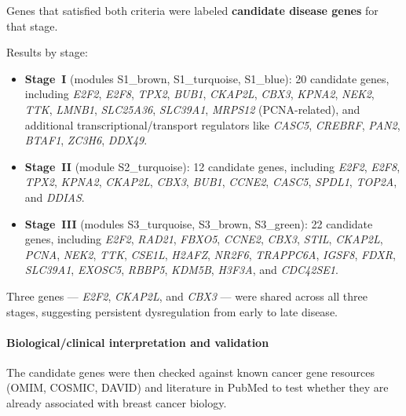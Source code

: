 \documentclass[10pt]{extarticle}
\begin{document}
Genes that satisfied both criteria were labeled \textbf{candidate disease genes} for that stage.

Results by stage:
\begin{itemize}[label=-]
    \item \textbf{Stage~I} (modules S1\_brown, S1\_turquoise, S1\_blue): 20 candidate genes, including \textit{E2F2}, \textit{E2F8}, \textit{TPX2}, \textit{BUB1}, \textit{CKAP2L}, \textit{CBX3}, \textit{KPNA2}, \textit{NEK2}, \textit{TTK}, \textit{LMNB1}, \textit{SLC25A36}, \textit{SLC39A1}, \textit{MRPS12} (PCNA-related), and additional transcriptional/transport regulators like \textit{CASC5}, \textit{CREBRF}, \textit{PAN2}, \textit{BTAF1}, \textit{ZC3H6}, \textit{DDX49}.
    \item \textbf{Stage~II} (module S2\_turquoise): 12 candidate genes, including \textit{E2F2}, \textit{E2F8}, \textit{TPX2}, \textit{KPNA2}, \textit{CKAP2L}, \textit{CBX3}, \textit{BUB1}, \textit{CCNE2}, \textit{CASC5}, \textit{SPDL1}, \textit{TOP2A}, and \textit{DDIAS}.
    \item \textbf{Stage~III} (modules S3\_turquoise, S3\_brown, S3\_green): 22 candidate genes, including \textit{E2F2}, \textit{RAD21}, \textit{FBXO5}, \textit{CCNE2}, \textit{CBX3}, \textit{STIL}, \textit{CKAP2L}, \textit{PCNA}, \textit{NEK2}, \textit{TTK}, \textit{CSE1L}, \textit{H2AFZ}, \textit{NR2F6}, \textit{TRAPPC6A}, \textit{IGSF8}, \textit{FDXR}, \textit{SLC39A1}, \textit{EXOSC5}, \textit{RBBP5}, \textit{KDM5B}, \textit{H3F3A}, and \textit{CDC42SE1}.
\end{itemize}

Three genes --- \textit{E2F2}, \textit{CKAP2L}, and \textit{CBX3} --- were shared across all three stages, suggesting persistent dysregulation from early to late disease.

\paragraph{Biological/clinical interpretation and validation}
The candidate genes were then checked against known cancer gene resources (OMIM, COSMIC, DAVID) and literature in PubMed to test whether they are already associated with breast cancer biology.
\end{document}
